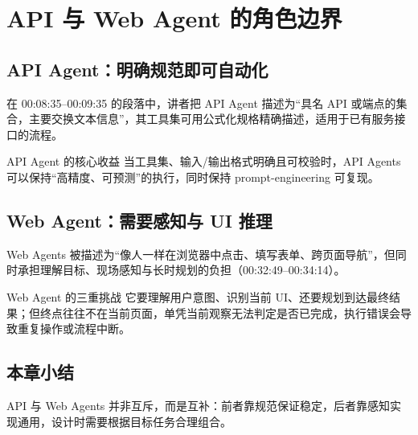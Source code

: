 \section{API 与 Web Agent 的角色边界}
\subsection{API Agent：明确规范即可自动化}
在 00:08:35--00:09:35 的段落中，讲者把 API Agent 描述为“具名 API 或端点的集合，主要交换文本信息”，其工具集可用公式化规格精确描述，适用于已有服务接口的流程。

\begin{knowledgebox}{API Agent 的核心收益}
当工具集、输入/输出格式明确且可校验时，API Agents 可以保持“高精度、可预测”的执行，同时保持 prompt-engineering 可复现。
\end{knowledgebox}

\subsection{Web Agent：需要感知与 UI 推理}
Web Agents 被描述为“像人一样在浏览器中点击、填写表单、跨页面导航”，但同时承担理解目标、现场感知与长时规划的负担（00:32:49--00:34:14）。

\begin{warningbox}{Web Agent 的三重挑战}
它要理解用户意图、识别当前 UI、还要规划到达最终结果；但终点往往不在当前页面，单凭当前观察无法判定是否已完成，执行错误会导致重复操作或流程中断。
\end{warningbox}

\subsection{本章小结}
API 与 Web Agents 并非互斥，而是互补：前者靠规范保证稳定，后者靠感知实现通用，设计时需要根据目标任务合理组合。

